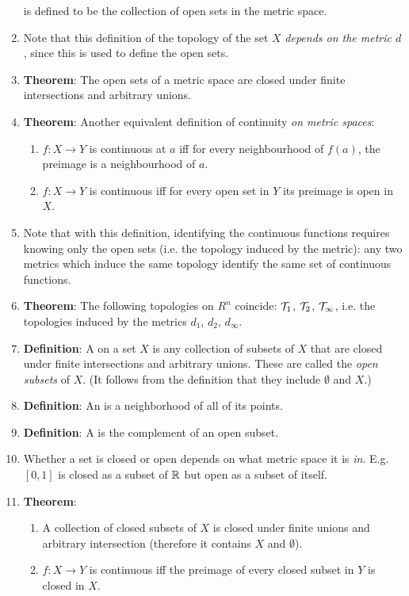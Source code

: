 \begin{enumerate}
  is defined to be the collection of open sets in the metric space.
\item Note that this definition of the topology of the set $X$ {\it depends on the metric $d$}, since
  this is used to define the open sets.
\item {\bf Theorem}: The open sets of a metric space are closed under finite intersections and arbitrary
  unions.
\item {\bf Theorem}: Another equivalent definition of continuity {\it on metric spaces}:
  \begin{enumerate}[label=(\roman*)]
  \item $f:X \to Y$ is continuous at $a$ iff for every neighbourhood of $f(a)$, the preimage is a
    neighbourhood of $a$.
  \item $f:X \to Y$ is continuous iff for every open set in $Y$ its preimage is open in $X$.
  \end{enumerate}
\item Note that with this definition, identifying the continuous functions requires knowing only
  the open sets (i.e. the topology induced by the metric): any two metrics which induce the same
  topology identify the same set of continuous functions.
\item {\bf Theorem}: The following topologies on $R^n$ coincide: $\mathcal T_1$, $\mathcal T_2$, $\mathcal T_\infty$,
  i.e. the topologies induced by the metrics $d_1$, $d_2$, $d_\infty$.
\item {\bf Definition}: A  on a set $X$ is any collection of subsets of $X$ that are
  closed under finite intersections and arbitrary unions. These are called the {\it open subsets}
  of $X$. (It follows from the definition that they include $\emptyset$ and $X$.)
\item {\bf Definition}: An  is a neighborhood of all of its points.
\item {\bf Definition}: A  is the complement of an open subset.
\item Whether a set is closed or open depends on what metric space it is {\it in}. E.g. $[0, 1]$ is
  closed as a subset of $\mathbb{R}$ but open as a subset of itself.
\item {\bf Theorem}:
  \begin{enumerate}[label=(\roman*)]
  \item A collection of closed subsets of $X$ is closed under finite unions and arbitrary
    intersection (therefore it contains $X$ and $\emptyset$).
  \item $f:X \to Y$ is continuous iff the preimage of every closed subset in $Y$ is closed in $X$.

\end{enumerate}
\end{enumerate}
